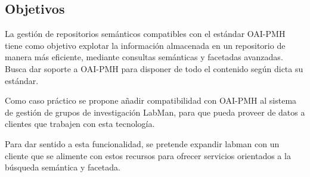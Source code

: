 \subsection{Objetivos}

La gestión de repositorios semánticos compatibles con el estándar OAI-PMH tiene como objetivo explotar la información almacenada en un repositorio de manera más eficiente, mediante consultas semánticas y facetadas avanzadas. Busca dar soporte a OAI-PMH para disponer de todo el contenido según dicta su estándar.

Como caso práctico se propone añadir compatibilidad con OAI-PMH al sistema de gestión de grupos de investigación LabMan, para que pueda proveer de datos a clientes que trabajen con esta tecnología.

Para dar sentido a esta funcionalidad, se pretende expandir labman con un cliente que se alimente con estos recursos para ofrecer servicios orientados a la búsqueda semántica y facetada.